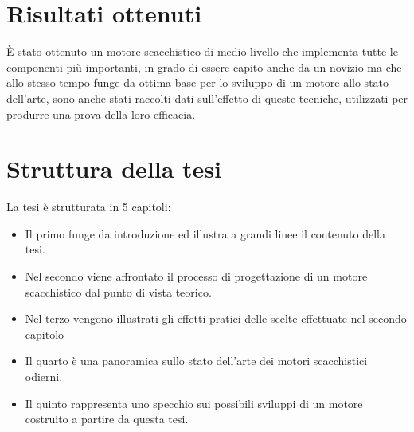 \section{Risultati ottenuti}
È stato ottenuto un motore scacchistico di medio livello che implementa tutte le componenti più importanti, in grado di essere 
capito anche da un novizio ma che allo stesso tempo funge da ottima base per lo sviluppo di un motore allo stato dell'arte, sono anche
stati raccolti dati sull'effetto di queste tecniche, utilizzati per produrre una prova della loro efficacia.



\section{Struttura della tesi}
La tesi è strutturata in 5 capitoli:
\begin{itemize}
\item Il primo funge da introduzione ed illustra a grandi linee il contenuto della tesi. 
\item Nel secondo viene affrontato il processo di progettazione di un motore scacchistico dal punto di vista teorico.
\item Nel terzo vengono illustrati gli effetti pratici delle scelte effettuate nel secondo capitolo
\item Il quarto è una panoramica sullo stato dell'arte dei motori scacchistici odierni.
\item Il quinto rappresenta uno specchio sui possibili sviluppi di un motore costruito a partire da questa tesi.
\end{itemize}
